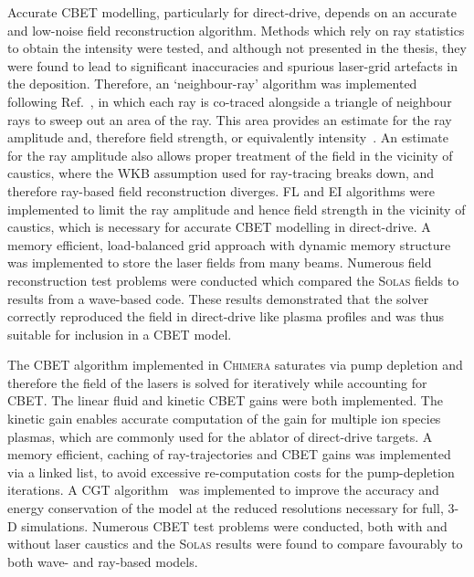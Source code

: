 Accurate \ac{CBET} modelling, particularly for direct-drive, depends on an accurate and low-noise field reconstruction algorithm.
Methods which rely on ray statistics to obtain the intensity were tested, and although not presented in the thesis, they were found to lead to significant inaccuracies and spurious laser-grid artefacts in the deposition.
Therefore, an `neighbour-ray' algorithm was implemented following Ref.~\cite{follett_validation_2022}, in which each ray is co-traced alongside a triangle of neighbour rays to sweep out an area of the ray.
This area provides an estimate for the ray amplitude and, therefore field strength, or equivalently intensity~\cite{tracy_ray_2014}.
An estimate for the ray amplitude also allows proper treatment of the field in the vicinity of caustics, where the WKB assumption used for ray-tracing breaks down, and therefore ray-based field reconstruction diverges.
\ac{FL} and \ac{EI} algorithms were implemented to limit the ray amplitude and hence field strength in the vicinity of caustics, which is necessary for accurate \ac{CBET} modelling in direct-drive.
A memory efficient, load-balanced grid approach with dynamic memory structure was implemented to store the laser fields from many beams.
Numerous field reconstruction test problems were conducted which compared the \textsc{Solas} fields to results from a wave-based code.
These results demonstrated that the solver correctly reproduced the field in direct-drive like plasma profiles and was thus suitable for inclusion in a \ac{CBET} model.

The \ac{CBET} algorithm implemented in \textsc{Chimera} saturates via pump depletion and therefore the field of the lasers is solved for iteratively while accounting for \ac{CBET}.
The linear fluid and kinetic \ac{CBET} gains were both implemented.
The kinetic gain enables accurate computation of the gain for multiple ion species plasmas, which are commonly used for the ablator of direct-drive targets.
A memory efficient, caching of ray-trajectories and \ac{CBET} gains was implemented via a linked list, to avoid excessive re-computation costs for the pump-depletion iterations.
A \ac{CGT} algorithm~\cite{follett_raybased_2018} was implemented to improve the accuracy and energy conservation of the model at the reduced resolutions necessary for full, 3-D simulations.
Numerous \ac{CBET} test problems were conducted, both with and without laser caustics and the \textsc{Solas} results were found to compare favourably to both wave- and ray-based models.

